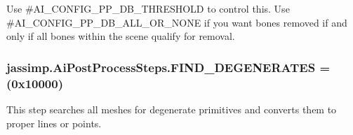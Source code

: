 Use {\ttfamily \#\+A\+I\+\_\+\+C\+O\+N\+F\+I\+G\+\_\+\+P\+P\+\_\+\+D\+B\+\_\+\+T\+H\+R\+E\+S\+H\+O\+L\+D} to control this. Use {\ttfamily \#\+A\+I\+\_\+\+C\+O\+N\+F\+I\+G\+\_\+\+P\+P\+\_\+\+D\+B\+\_\+\+A\+L\+L\+\_\+\+O\+R\+\_\+\+N\+O\+N\+E} if you want bones removed if and only if all bones within the scene qualify for removal. \hypertarget{enumjassimp_1_1_ai_post_process_steps_abf87e4bf911759a4141e5ba4596e29c1}{
\subsubsection[{F\+I\+N\+D\+\_\+\+D\+E\+G\+E\+N\+E\+R\+A\+T\+E\+S}]{\setlength{\rightskip}{0pt plus 5cm}jassimp.\+Ai\+Post\+Process\+Steps.\+F\+I\+N\+D\+\_\+\+D\+E\+G\+E\+N\+E\+R\+A\+T\+E\+S =(0x10000)}}\label{enumjassimp_1_1_ai_post_process_steps_abf87e4bf911759a4141e5ba4596e29c1}
This step searches all meshes for degenerate primitives and converts them to proper lines or points.

